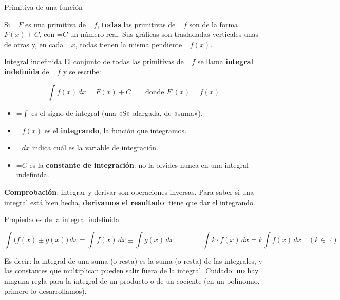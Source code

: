 \documentclass[11pt,a4paper]{article}
\newcommand{\fmm}[1]{\setbox0=\hbox{$#1$}\ifdim\wd0>\linewidth\[#1\]\else\mbox{\box0}\fi}
\newcommand{\fmuline}[1]{\textbf{\color{fmaccent}#1}}
\begin{document}
\begin{fmdef}{Primitiva de una función}
      
\begin{fmnote}Si \fmm{F} es una primitiva de \fmm{f}, \textbf{todas} las primitivas de \fmm{f} son de la forma \fmm{F(x)+C}, con \fmm{C} un número real. Sus gráficas son trasladadas verticales unas de otras y, en cada \fmm{x}, todas tienen la misma pendiente \fmm{f(x)}.\end{fmnote}
\end{fmdef}

  
\begin{fmdef}{Integral indefinida}
El conjunto de todas las primitivas de \fmm{f} se llama \textbf{integral indefinida} de \fmm{f} y se escribe:

      
\[\int f(x)\,dx=F(x)+C\qquad\text{donde }F'(x)=f(x)\]

      
\begin{itemize}
\item \fmm{\int} es el signo de integral (una «S» alargada, de «suma»).
\item \fmm{f(x)} es el \textbf{integrando}, la función que integramos.
\item \fmm{dx} indica cuál es la variable de integración.
\item \fmm{C} es la \textbf{constante de integración}: no la olvides nunca en una integral indefinida.
\end{itemize}

      
\begin{fmnote}\fmuline{Comprobación}: integrar y derivar son operaciones inversas. Para saber si una integral está bien hecha, \textbf{derivamos el resultado}: tiene que dar el integrando.\end{fmnote}
\end{fmdef}

  
\begin{fmprop}{Propiedades de la integral indefinida}

\[\int\big(f(x)\pm g(x)\big)\,dx=\int f(x)\,dx\pm\int g(x)\,dx\qquad\qquad\int k\cdot f(x)\,dx=k\int f(x)\,dx\quad(k\in\mathbb R)\]

      

Es decir: la integral de una suma (o resta) es la suma (o resta) de las integrales, y las constantes que multiplican pueden salir fuera de la integral. Cuidado: \textbf{no} hay ninguna regla para la integral de un producto o de un cociente (en un polinomio, primero lo desarrollamos).
\end{fmprop}
\end{document}
